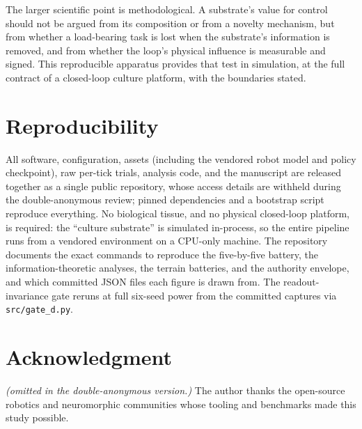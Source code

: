 The larger scientific point is methodological. A substrate's value for control
should not be argued from its composition or from a novelty mechanism, but from
whether a load-bearing task is lost when the substrate's information is removed,
and from whether the loop's physical influence is measurable and signed. This
reproducible apparatus provides that test in simulation, at the full contract
of a closed-loop culture platform, with the boundaries stated.

\section{Reproducibility}

All software, configuration, assets (including the vendored robot model and
policy checkpoint), raw per-tick trials, analysis code, and the manuscript are
released together as a single public repository, whose access details are
withheld during the double-anonymous review; pinned dependencies and a
bootstrap script reproduce everything. No biological tissue, and no physical closed-loop platform, is required:
the ``culture substrate'' is simulated in-process, so the entire pipeline runs
from a vendored environment on a CPU-only machine. The repository documents the
exact commands to reproduce the five-by-five battery, the information-theoretic
analyses, the terrain batteries, and the authority envelope, and which committed
JSON files each figure is drawn from. The readout-invariance gate reruns at
full six-seed power from the committed captures via \texttt{src/gate\_d.py}.

\section*{Acknowledgment}

\ifDoubleBlind
\textit{(omitted in the double-anonymous version.)}
\else
The author thanks the open-source robotics and neuromorphic communities whose
tooling and benchmarks made this study possible.
\fi


